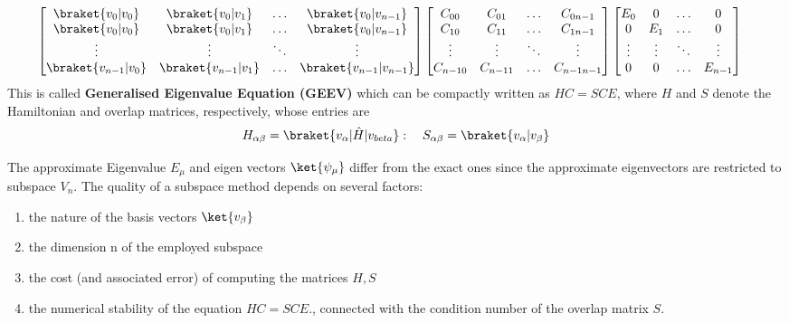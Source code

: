 \documentclass[12pt, oneside]{book}
\theoremstyle{definition}
\theoremstyle{definition}
\theoremstyle{remark}
\begin{document}
\begin{align*}
\begin{bmatrix} \braket{v_0|v_0} & \braket{v_0|v_1} & \ldots & \braket{v_{0}|v_{n-1}} \\
\braket{v_0|v_0} & \braket{v_0|v_1} & \ldots & \braket{v_{0}|v_{n-1}} \\
\vdots & \vdots & \ddots & \vdots  \\
\braket{v_{n-1}|v_0} & \braket{v_{n-1}|v_1} & \ldots & \braket{v_{n-1}|v_{n-1}} \\
\end{bmatrix}\begin{bmatrix} C_{00} & C_{01} & \ldots & C_{0n-1} \\ 
C_{10} & C_{11} & \ldots & C_{1n-1} \\ 
\vdots & \vdots & \ddots & \vdots \\
C_{n-10} & C_{n-11} & \ldots & C_{n-1n-1} 
\end{bmatrix}\begin{bmatrix} E_{0} & 0 & \ldots & 0 \\ 
0 & E_1 & \ldots &0 \\ 
\vdots & \vdots & \ddots & \vdots \\
0 & 0 & \ldots & E_{n-1} 
\end{bmatrix} &
\end{align*}
This is called \textbf{Generalised Eigenvalue Equation (GEEV)} which can be compactly written as $HC=SCE$, where $H$ and $S$ denote the Hamiltonian and overlap matrices, respectively, whose entries are
\[
H_{\alpha\beta}=\braket{v_{\alpha}|\hat{H}|v_{beta}}: \quad S_{\alpha\beta}=\braket{v_{\alpha}|v_{\beta}}
\]

\begin{importantnote}
    The approximate Eigenvalue $E_{\mu}$ and eigen vectors $\ket{\psi_\mu}$ differ from the exact ones since the approximate eigenvectors are restricted to subspace $V_n$. The quality of a subspace method depends on several factors:
    \begin{enumerate}
        \item the nature of the basis vectors $\ket{v_{\beta}}$
        \item the dimension n of the employed subspace
        \item the cost (and associated error) of computing the matrices $H, S$ 
        \item the numerical stability of the equation $HC=SCE$., connected with the condition number of the overlap matrix $S$.
    \end{enumerate}
\end{importantnote}
\end{document}
